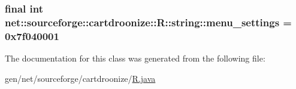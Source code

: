 \label{classnet_1_1sourceforge_1_1cartdroonize_1_1R_1_1string_a102a7d2a9b152527d5c1207c4b143bc3}
\hypertarget{classnet_1_1sourceforge_1_1cartdroonize_1_1R_1_1string_a3042f3578a6f658724721574d4682213}{
\subsubsection[{menu\_\-settings}]{\setlength{\rightskip}{0pt plus 5cm}final int {\bf net::sourceforge::cartdroonize::R::string::menu\_\-settings} = 0x7f040001}}
\label{classnet_1_1sourceforge_1_1cartdroonize_1_1R_1_1string_a3042f3578a6f658724721574d4682213}


The documentation for this class was generated from the following file:\begin{DoxyCompactItemize}
\item 
gen/net/sourceforge/cartdroonize/\hyperlink{R_8java}{R.java}\end{DoxyCompactItemize}
